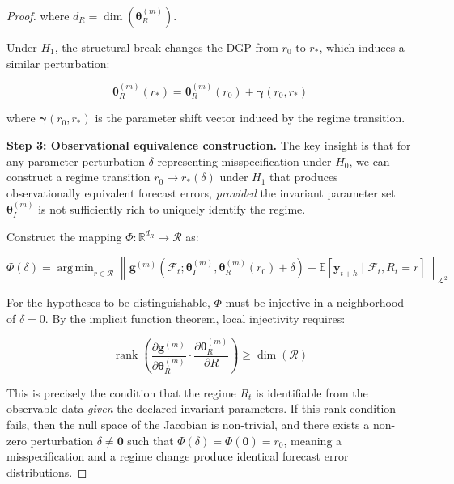\documentclass[12pt,a4paper]{article}
\DeclareMathOperator*{\argmin}{arg\,min}
\DeclareMathOperator{\rank}{rank}
\begin{document}
\begin{proof}
where $d_R = \dim(\boldsymbol{\theta}^{(m)}_R)$.

Under $H_1$, the structural break changes the DGP from $r_0$ to $r_*$,
which induces a similar perturbation:

\begin{equation}
    \boldsymbol{\theta}^{(m)}_R(r_*) = \boldsymbol{\theta}^{(m)}_R(r_0)
    + \boldsymbol{\gamma}(r_0, r_*) \label{eq:regime_perturb}
\end{equation}

where $\boldsymbol{\gamma}(r_0, r_*)$ is the parameter shift vector
induced by the regime transition.

\medskip\noindent
\textbf{Step 3: Observational equivalence construction.}
The key insight is that for any parameter perturbation $\delta$
representing misspecification under $H_0$, we can construct a regime
transition $r_0 \to r_*(\delta)$ under $H_1$ that produces
observationally equivalent forecast errors, \emph{provided} the
invariant parameter set $\boldsymbol{\theta}^{(m)}_I$ is not
sufficiently rich to uniquely identify the regime.

Construct the mapping $\Phi: \mathbb{R}^{d_R} \to \mathcal{R}$ as:

\begin{equation}
    \Phi(\delta) = \argmin_{r \in \mathcal{R}}
    \left\| \mathbf{g}^{(m)}\left(\mathcal{F}_t; \boldsymbol{\theta}^{(m)}_I,
    \boldsymbol{\theta}^{(m)}_R(r_0) + \delta\right) -
    \mathbb{E}\left[\mathbf{y}_{t+h} \mid \mathcal{F}_t, R_t = r\right]
    \right\|_{\mathcal{L}^2} \label{eq:phi_map}
\end{equation}

For the hypotheses to be distinguishable, $\Phi$ must be injective
in a neighborhood of $\delta = 0$.  By the implicit function theorem,
local injectivity requires:

\begin{equation}
    \rank\left(\frac{\partial \mathbf{g}^{(m)}}{\partial
    \boldsymbol{\theta}^{(m)}_R} \cdot
    \frac{\partial \boldsymbol{\theta}^{(m)}_R}{\partial R}\right)
    \geq \dim(\mathcal{R}) \label{eq:rank_condition}
\end{equation}

This is precisely the condition that the regime $R_t$ is identifiable
from the observable data \emph{given} the declared invariant parameters.
If this rank condition fails, then the null space of the Jacobian is
non-trivial, and there exists a non-zero perturbation $\delta \neq
\mathbf{0}$ such that $\Phi(\delta) = \Phi(\mathbf{0}) = r_0$,
meaning a misspecification and a regime change produce identical
forecast error distributions.


\end{proof}
\end{document}
